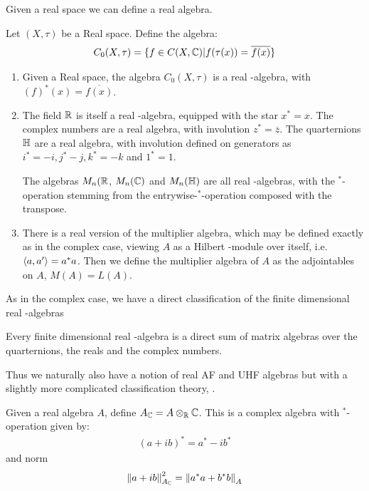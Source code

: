 \noindent Given a real space we can define a real \Cstar algebra.
\begin{definition}
	Let $(X,\tau)$ be a Real space. Define the algebra:
	\begin{align*}
		C_0(X,\tau)=\{f\in C(X,\mathbb{C}) | f(\tau(x))=\overline{f(x)}\}
	\end{align*}
\end{definition} 
\begin{example}
	\begin{enumerate}
	\item 
		Given a Real space, the algebra $C_0(X,\tau)$ is a real \Cstar-algebra, with $(f)^*(x)=\overline{f(x)}$. 
	\item
		The field $\mathbb{R}$ is itself a real \Cstar-algebra, equipped with the star $x^*=x$. The complex numbers are a real \Cstar algebra, with involution $z^*=\overline{z}$. The quarternions $\mathbb{H}$ are a real \Cstar algebra, with involution defined on generators as $i^*=-i,j^*-j,k^*=-k$ and $1^*=1$. 
		
		The algebras $M_n(\mathbb{R}$, $M_n(\mathbb{C})$ and $M_n(\mathbb{H})$ are all real \Cstar-algebras, with the $^*$-operation stemming from the entrywise-$^*$-operation composed with the transpose. 
	\item
		There is a real version of the multiplier algebra, which may be defined exactly as in the complex case, viewing $A$ as a Hilbert \Cstar-module over itself, i.e. $\left \langle a,a' \right \rangle=a^*a$. Then we define the multiplier algebra of $A$ as the adjointables on $A$, $M(A)=L(A)$. 
	\end{enumerate}
\end{example}
\noindent As in the complex case, we have a direct classification of the finite dimensional real \Cstar-algebras 
\begin{theorem}
	Every finite dimensional real \Cstar-algebra is a direct sum of matrix algebras over the quarternions, the reals and the complex numbers. 
\end{theorem}
Thus we naturally also have a notion of real AF and UHF algebras but with a slightly more complicated classification theory, \cite{giordano}. 
\begin{definition}
	Given a real \Cstar algebra $A$, define $A_{\mathbb{C}}=A\otimes_{\mathbb{R}} \mathbb{C}$. This is a complex \Cstar algebra with $^*$-operation given by: 
	\begin{align*}
		(a+ib)^*=a^*-ib^*
	\end{align*}
	and norm 
	\begin{align*}
		\left \Vert a+ib \right \Vert_{A_{\mathbb{C}}}^2=\left \Vert a^*a+b^*b \right \Vert_A
	\end{align*}
\end{definition}

